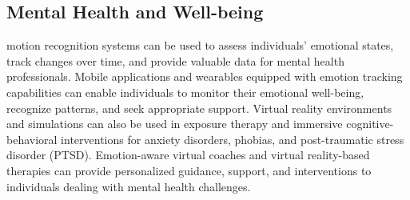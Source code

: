 \subsection{Mental Health and Well-being}
motion recognition systems can be used to assess individuals' emotional states, track changes over time, and provide valuable data for mental health professionals.
Mobile applications and wearables equipped with emotion tracking capabilities can enable individuals to monitor their emotional well-being, recognize patterns, 
and seek appropriate support. Virtual reality environments and simulations can also be used in exposure therapy and immersive cognitive-behavioral interventions for anxiety disorders,
 phobias, and post-traumatic stress disorder (PTSD). 
Emotion-aware virtual coaches and virtual reality-based therapies can provide personalized guidance, support, and interventions to individuals dealing with mental health challenges.